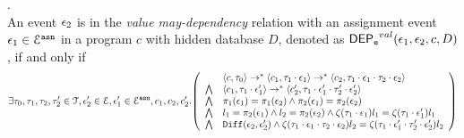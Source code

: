 \begin{defn}
\label{def:event_valdep}.
\\
An event $\mathtt{\epsilon}_2$ is in the \emph{value may-dependency} relation with an assignment
event $\mathtt{\epsilon}_1 \in \mathcal{E}^{\mathtt{{asn}}}$ in a program ${c}$
with hidden database $D$, denoted as 
%
$\mathsf{DEP_{\mathtt{e}}}^{val}(\mathtt{\epsilon}_1, \mathtt{\epsilon}_2, c, D)$, if and only if
%
\[
\exists \vtrace_0,
\vtrace_1, \vtrace_2, \vtrace_2' \in \mathcal{T}, \event_2' \in \eventset, \event_1' \in \eventset^{\asn}, {c}_1, {c}_2,  {c}_2'.
  \left(
  \begin{array}{ll}   
 & \config{{c}, \vtrace_0} \rightarrow^{*} 
\config{{c}_1, \vtrace_1 \cdot \event_1}  \rightarrow^{*} 
  \config{{c}_2,  \vtrace_1 \cdot \event_1 \cdot \vtrace_2 \cdot \event_2 } 
 \\ 
 \bigwedge &
  \config{{c}_1, \vtrace_1 \cdot \event_1'}  \rightarrow^{*} 
  \config{{c}_2',  \vtrace_1 \cdot \event_1' \cdot \vtrace_2' \cdot \event_2' } 
\\
\bigwedge &  \pi_1(\event_1) = \pi_1(\event_2) \land \pi_2(\event_1) = \pi_2(\event_2) \\
\bigwedge & l_1 = \pi_2(\event_1) \land l_2 = \pi_2(\event_2)
\land \vcounter(\vtrace_1 \cdot \event_1) l_1 = \vcounter(\vtrace_1 \cdot \event_1')l_1 
\\
\bigwedge & 
\diff(\event_2,\event_2' ) \land 
\vcounter(\vtrace_1 \cdot \event_1 \cdot \vtrace_2\cdot \event_2) l_2
= 
\vcounter(\vtrace_1 \cdot \event_1' \cdot \vtrace_2'\cdot \event_2') l_2\\
\end{array}
\right)
 \]
%
\end{defn}
